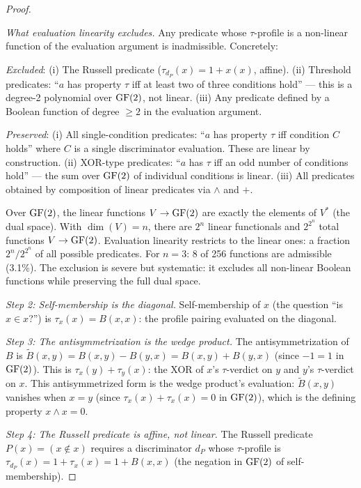 \begin{proof}
\begin{definition}
\emph{What evaluation linearity excludes.}
Any predicate whose $\tau$-profile is a non-linear
function of the evaluation argument is inadmissible.
Concretely:

\emph{Excluded}: (i) The Russell predicate
($\tau_{d_P}(x) = 1 + x(x)$, affine). (ii) Threshold
predicates: ``$a$ has property $\tau$ iff at least two
of three conditions hold'' --- this is a degree-2
polynomial over $\operatorname{GF}(2)$, not linear. (iii) Any
predicate defined by a Boolean function of degree
$\geq 2$ in the evaluation argument.

\emph{Preserved}: (i) All single-condition predicates:
``$a$ has property $\tau$ iff condition $C$ holds'' where
$C$ is a single discriminator evaluation. These are
linear by construction. (ii) XOR-type predicates:
``$a$ has $\tau$ iff an odd number of conditions hold''
--- the sum over $\operatorname{GF}(2)$ of individual conditions is
linear. (iii) All predicates obtained by composition of
linear predicates via $\wedge$ and $+$.

Over $\operatorname{GF}(2)$, the linear functions $V \to \operatorname{GF}(2)$ are
exactly the elements of $V^*$ (the dual space). With
$\dim(V) = n$, there are $2^n$ linear functionals and
$2^{2^n}$ total functions $V \to \operatorname{GF}(2)$. Evaluation
linearity restricts to the linear ones: a fraction
$2^n / 2^{2^n}$ of all possible predicates. For $n = 3$:
8 of 256 functions are admissible (3.1\%). The exclusion
is severe but systematic: it excludes all non-linear
Boolean functions while preserving the full dual space.
\end{definition}

\emph{Step 2: Self-membership is the diagonal.}
Self-membership of $x$ (the question ``is $x \in x$?'')
is $\tau_x(x) = B(x, x)$: the profile pairing evaluated
on the diagonal.

\emph{Step 3: The antisymmetrization is the wedge product.}
The antisymmetrization of $B$ is
$\widetilde{B}(x, y) = B(x, y) - B(y, x) = B(x, y)
+ B(y, x)$ (since $-1 = 1$ in $\operatorname{GF}(2)$). This is
$\tau_x(y) + \tau_y(x)$: the XOR of $x$'s $\tau$-verdict
on $y$ and $y$'s $\tau$-verdict on $x$. This
antisymmetrized form is the wedge product's evaluation:
$\widetilde{B}(x, y)$ vanishes when $x = y$ (since
$\tau_x(x) + \tau_x(x) = 0$ in $\operatorname{GF}(2)$), which is the
defining property $x \wedge x = 0$.

\emph{Step 4: The Russell predicate is affine, not linear.}
The Russell predicate $P(x) = (x \notin x)$ requires a
discriminator $d_P$ whose $\tau$-profile is
$\tau_{d_P}(x) = 1 + \tau_x(x) = 1 + B(x,x)$
(the negation in $\operatorname{GF}(2)$ of self-membership).


\end{proof}

